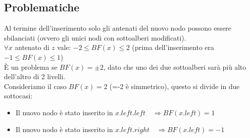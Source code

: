 \documentclass[a4paper,12pt]{article}
\begin{document}
\subsection{Problematiche}
Al termine dell'inserimento solo gli antenati del nuovo nodo possono essere sbilanciati (ovvero gli unici nodi con sottoalberi modificati). \\
$\forall x$ antenato di $z$ vale: \quad $-2\leq BF(x) \leq 2$ \quad (prima dell'inserimento era $-1\leq BF(x) \leq 1$)\\
È un problema se $BF(x)=\pm2$, dato che uno dei due sottoalberi sarà più alto dell'altro di 2 livelli.\\
Consideriamo il caso $BF(x)=2$ (=-2 è simmetrico), questo si divide in due sottocasi:
\begin{itemize}
    \item Il nuovo nodo è stato inserito in $x.left.left \quad \Rightarrow BF(x.left)=1$ 
    \item Il nuovo nodo è stato inserito in $x.left.right \quad \Rightarrow BF(x.left)=-1$ 
\end{itemize}
\end{document}
